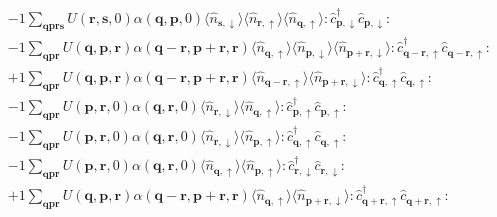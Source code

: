 \begin{align*}
	&-1 \sum_{ \mathbf{q} \mathbf{p} \mathbf{r} \mathbf{s} } U( \mathbf{r}, \mathbf{s}, 0 )  \alpha( \mathbf{q}, \mathbf{p}, 0 )   \langle \hat{n}_{ \mathbf{s}, \downarrow } \rangle \langle \hat{n}_{ \mathbf{r}, \uparrow } \rangle \langle \hat{n}_{ \mathbf{q}, \uparrow } \rangle :\hat{c}_{ \mathbf{p}, \downarrow }^\dagger \hat{c}_{ \mathbf{p}, \downarrow }^{\phantom{\dagger}}: \\
	&-1 \sum_{ \mathbf{q} \mathbf{p} \mathbf{r} } U( \mathbf{q}, \mathbf{p}, \mathbf{r} )  \alpha( \mathbf{q}-\mathbf{r}, \mathbf{p}+\mathbf{r}, \mathbf{r} )   \langle \hat{n}_{ \mathbf{q}, \uparrow } \rangle \langle \hat{n}_{ \mathbf{p}, \downarrow } \rangle \langle \hat{n}_{ \mathbf{p}+\mathbf{r}, \downarrow } \rangle :\hat{c}_{ \mathbf{q}-\mathbf{r}, \uparrow }^\dagger \hat{c}_{ \mathbf{q}-\mathbf{r}, \uparrow }^{\phantom{\dagger}}: \\
	&+1 \sum_{ \mathbf{q} \mathbf{p} \mathbf{r} } U( \mathbf{q}, \mathbf{p}, \mathbf{r} )  \alpha( \mathbf{q}-\mathbf{r}, \mathbf{p}+\mathbf{r}, \mathbf{r} )   \langle \hat{n}_{ \mathbf{q}-\mathbf{r}, \uparrow } \rangle \langle \hat{n}_{ \mathbf{p}+\mathbf{r}, \downarrow } \rangle :\hat{c}_{ \mathbf{q}, \uparrow }^\dagger \hat{c}_{ \mathbf{q}, \uparrow }^{\phantom{\dagger}}: \\
	&-1 \sum_{ \mathbf{q} \mathbf{p} \mathbf{r} } U( \mathbf{p}, \mathbf{r}, 0 )  \alpha( \mathbf{q}, \mathbf{r}, 0 )   \langle \hat{n}_{ \mathbf{r}, \downarrow } \rangle \langle \hat{n}_{ \mathbf{q}, \uparrow } \rangle :\hat{c}_{ \mathbf{p}, \uparrow }^\dagger \hat{c}_{ \mathbf{p}, \uparrow }^{\phantom{\dagger}}: \\
	&-1 \sum_{ \mathbf{q} \mathbf{p} \mathbf{r} } U( \mathbf{p}, \mathbf{r}, 0 )  \alpha( \mathbf{q}, \mathbf{r}, 0 )   \langle \hat{n}_{ \mathbf{r}, \downarrow } \rangle \langle \hat{n}_{ \mathbf{p}, \uparrow } \rangle :\hat{c}_{ \mathbf{q}, \uparrow }^\dagger \hat{c}_{ \mathbf{q}, \uparrow }^{\phantom{\dagger}}: \\
	&-1 \sum_{ \mathbf{q} \mathbf{p} \mathbf{r} } U( \mathbf{p}, \mathbf{r}, 0 )  \alpha( \mathbf{q}, \mathbf{r}, 0 )   \langle \hat{n}_{ \mathbf{q}, \uparrow } \rangle \langle \hat{n}_{ \mathbf{p}, \uparrow } \rangle :\hat{c}_{ \mathbf{r}, \downarrow }^\dagger \hat{c}_{ \mathbf{r}, \downarrow }^{\phantom{\dagger}}: \\
	&+1 \sum_{ \mathbf{q} \mathbf{p} \mathbf{r} } U( \mathbf{q}, \mathbf{p}, \mathbf{r} )  \alpha( \mathbf{q}-\mathbf{r}, \mathbf{p}+\mathbf{r}, \mathbf{r} )   \langle \hat{n}_{ \mathbf{q}, \uparrow } \rangle \langle \hat{n}_{ \mathbf{p}+\mathbf{r}, \downarrow } \rangle :\hat{c}_{ \mathbf{q}+\mathbf{r}, \uparrow }^\dagger \hat{c}_{ \mathbf{q}+\mathbf{r}, \uparrow }^{\phantom{\dagger}}: \\

\end{align*}
